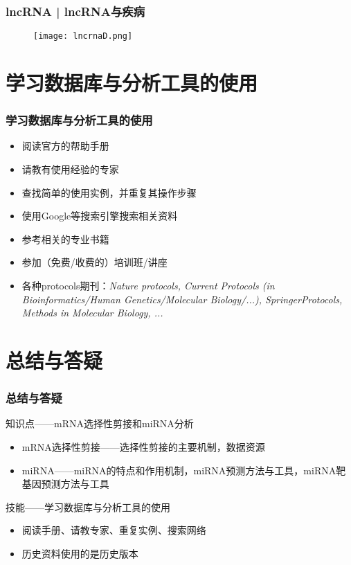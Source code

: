\begin{frame}
  \frametitle{lncRNA | lncRNA与疾病}
  \begin{figure}
    \centering
    \texttt{[image: lncrnaD.png]}
  \end{figure}
\end{frame}

\section{学习数据库与分析工具的使用}
\begin{frame}
  \frametitle{学习数据库与分析工具的使用}
  \begin{itemize}
    \item 阅读官方的帮助手册
    \item 请教有使用经验的专家
    \item 查找简单的使用实例，并重复其操作步骤
    \item 使用Google等搜索引擎搜索相关资料
    \item 参考相关的专业书籍
    \item 参加（免费/收费的）培训班/讲座
    \item 各种protocols期刊：\textit{Nature protocols, Current Protocols (in Bioinformatics/Human Genetics/Molecular Biology/...), SpringerProtocols, Methods in Molecular Biology, ...}
  \end{itemize}
\end{frame}

\section{总结与答疑}
\begin{frame}
  \frametitle{总结与答疑}
  \begin{block}{知识点——mRNA选择性剪接和miRNA分析}
    \begin{itemize}
      \item mRNA选择性剪接——选择性剪接的主要机制，数据资源
      \item miRNA——miRNA的特点和作用机制，miRNA预测方法与工具，miRNA靶基因预测方法与工具
    \end{itemize}
  \end{block}
  \begin{block}{技能——学习数据库与分析工具的使用}
    \begin{itemize}
      \item 阅读手册、请教专家、重复实例、搜索网络
      \item 历史资料使用的是历史版本
    \end{itemize}
  \end{block}
\end{frame}

